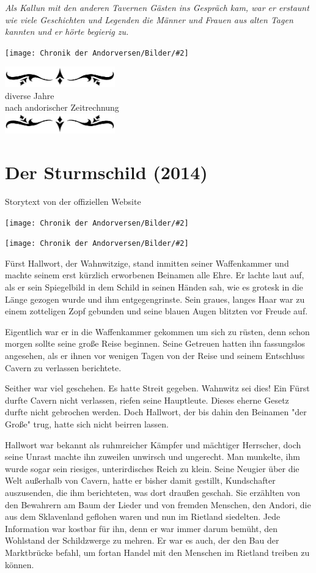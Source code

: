 \documentclass[10pt, a4paper, oneside]{book}
\newcommand{\fillbreak}{\vspace*{\fill}\columnbreak}
\newcommand{\storytext}[1]{%
    \section{#1}%
    \label{Storytext: #1}%
}
\newcommand{\bildmitts}[2][height=0.32\textwidth,width=0.48\textwidth,keepaspectratio]{%
    \begin{center}
        \texttt{[image: Chronik der Andorversen/Bilder/\#2]}
    \end{center}
}
\newcommand{\az}[1]{%
    \begin{center}
        \includegraphics[width=180px]{Chronik der Andorversen/verzierung1.png}\\
        {\Huge #1} \\
        {nach andorischer Zeitrechnung}\\
        \includegraphics[width=180px]{Chronik der Andorversen/verzierung2.png}
    \end{center}
    \extramarks{}{#1 a.Z.}
}
\begin{document}
\begin{multicols}{2}
\begin{chapterbox}
    \textit{Als Kallun mit den anderen Tavernen Gästen ins Gespräch kam, war er erstaunt wie viele Geschichten und Legenden die Männer und Frauen aus alten Tagen kannten und er hörte begierig zu.}
    
    \bildmitts[width=\textwidth]{Erzählerin.jpg}
    
\end{chapterbox}



\fillbreak
\az{diverse Jahre}

\storytext{Der Sturmschild (2014)}

\begin{center}
    Storytext von der offiziellen Website
\end{center}

\bildmitts{Der Sturmschild (2014).jpeg}

\bildmitts{Der Sturmschild Bild 1.png}

Fürst Hallwort, der Wahnwitzige, stand inmitten seiner Waffenkammer und machte seinem erst kürzlich erworbenen Beinamen alle Ehre. Er lachte laut auf, als er sein Spiegelbild in dem Schild in seinen Händen sah, wie es grotesk in die Länge gezogen wurde und ihm entgegengrinste. Sein graues, langes Haar war zu einem zotteligen Zopf gebunden und seine blauen Augen blitzten vor Freude auf.\bigskip

Eigentlich war er in die Waffenkammer gekommen um sich zu rüsten, denn schon morgen sollte seine große Reise beginnen. Seine Getreuen hatten ihn fassungslos angesehen, als er ihnen vor wenigen Tagen von der Reise und seinem  Entschluss Cavern zu verlassen berichtete.\bigskip

Seither war viel geschehen. Es hatte Streit gegeben. Wahnwitz sei dies! Ein Fürst durfte Cavern nicht verlassen, riefen seine Hauptleute. Dieses eherne Gesetz durfte nicht gebrochen werden. Doch Hallwort, der bis dahin den Beinamen "der Große" trug, hatte sich nicht beirren lassen.\bigskip

Hallwort war bekannt als ruhmreicher Kämpfer und mächtiger Herrscher, doch seine Unrast machte ihn zuweilen unwirsch und ungerecht. Man munkelte, ihm wurde sogar sein riesiges, unterirdisches Reich zu klein. Seine Neugier über die Welt außerhalb von Cavern, hatte er bisher damit gestillt, Kundschafter auszusenden, die ihm berichteten, was dort draußen geschah. Sie erzählten von den Bewahrern am Baum der Lieder und von fremden Menschen, den Andori, die aus dem Sklavenland geflohen waren und nun im Rietland siedelten. Jede Information war kostbar für ihn, denn er war immer darum bemüht, den Wohlstand der Schildzwerge zu mehren. Er war es auch, der den Bau der Marktbrücke befahl, um fortan Handel mit den Menschen im Rietland treiben zu können.\bigskip


\end{multicols}
\end{document}
